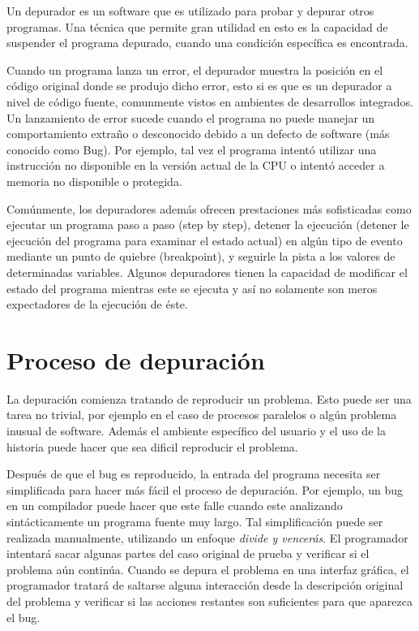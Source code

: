 \documentclass[12pt,legalpaper]{report}
\begin{document}
Un depurador es un software que es utilizado para probar y depurar otros programas.  Una técnica que permite gran utilidad en esto es la capacidad de suspender el programa depurado, cuando una condición específica es encontrada.

Cuando un programa lanza un error, el depurador muestra la posición en el código original donde se produjo dicho error, esto si es que es un depurador a nivel de código fuente, comunmente vistos en ambientes de desarrollos integrados.  Un lanzamiento de error sucede cuando el programa no puede manejar un comportamiento extraño o desconocido debido a un defecto de software (más conocido como Bug).  Por ejemplo, tal vez el programa intentó utilizar una instrucción no disponible en la versión actual de la CPU o intentó acceder a memoria no disponible o protegida.

Comúnmente, los depuradores además ofrecen prestaciones más sofisticadas como ejecutar un programa paso a paso (step by step), detener la ejecución (detener le ejecución del programa para examinar el estado actual) en algún tipo de evento mediante un punto de quiebre (breakpoint), y seguirle la pista a los valores de determinadas variables.  Algunos depuradores tienen la capacidad de modificar el estado del programa mientras este se ejecuta y así no solamente son meros expectadores de la ejecución de éste.

	\section{Proceso de depuración}

La depuración comienza tratando de reproducir un problema.  Esto puede ser una tarea no trivial, por ejemplo en el caso de procesos paralelos o algún problema inusual de software.  Además el ambiente específico del usuario y el uso de la historia puede hacer que sea dificil reproducir el problema.

Después de que el bug es reproducido, la entrada del programa necesita ser simplificada para hacer más fácil el proceso de depuración.  Por ejemplo, un bug en un compilador puede hacer que este falle cuando este analizando sintácticamente un programa fuente muy largo.  Tal simplificación puede ser realizada manualmente, utilizando un enfoque \textit{divide y vencerás}.  El programador intentará sacar algunas partes del caso original de prueba y verificar si el problema aún continúa.  Cuando se depura el problema en una interfaz gráfica, el programador tratará de saltarse alguna interacción desde la descripción original del problema y verificar si las acciones restantes son suficientes para que aparezca el bug.
\end{document}
